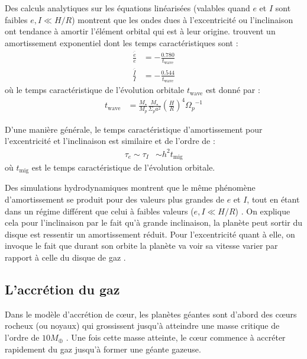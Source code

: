 Des calculs analytiques sur les équations linéarisées (valables quand $e$ et $I$ sont faibles $e,I \ll H/R$) montrent que les ondes dues à l'excentricité ou l'inclinaison ont tendance à amortir l'élément orbital qui est à leur origine. \cite[eqs. (45), (47)]{tanaka2004three} trouvent un amortissement exponentiel dont les temps caractéristiques sont : 
\begin{subequations}
\begin{align}
\frac{\overline{\dot{e}}}{e} &= -\frac{0.780}{t_\text{wave}}\\
\frac{\overline{\dot{I}}}{I} &= -\frac{0.544}{t_\text{wave}}
\end{align}
\end{subequations}
où le temps caractéristique de l'évolution orbitale $t_\text{wave}$ est donné par \cite[eq. (49)]{tanaka2004three} :
\begin{align}
t_\text{wave} &= \frac{M_\star}{M_p}\frac{M_\star}{\Sigma_p a^2} \left(\frac{H}{R}\right)^4 {\Omega_p}^{-1}
\end{align}

D'une manière générale, le temps caractéristique d'amortissement pour l'excentricité et l'inclinaison est similaire et de l'ordre de \citep{tanaka2004three} :
\begin{align}
\tau_e \sim \tau_I &\sim h^2 t_\text{mig}
\end{align}
où $t_\text{mig}$ est le temps caractéristique de l'évolution orbitale.

Des simulations hydrodynamiques montrent que le même phénomène d'amortissement se produit pour des valeurs plus grandes de $e$ et $I$, tout en étant dans un régime différent que celui à faibles valeurs ($e,I \ll H/R$) \citep{cresswell2007evolution}. On explique cela pour l'inclinaison par le fait qu'à grande inclinaison, la planète peut sortir du disque est ressentir un amortissement réduit. Pour l'excentricité quant à elle, on invoque le fait que durant son orbite la planète va voir sa vitesse varier par rapport à celle du disque de gaz \citep{papaloizou2000orbital}.

\subsection{L'accrétion du gaz}\label{sec:accretion_coeur}
Dans le modèle d'accrétion de cœur, les planètes géantes sont d'abord des cœurs rocheux (ou noyaux) qui grossissent jusqu'à 
atteindre une masse critique de l'ordre de $10 M_{\oplus}$ \citep{pollack1996formation}. Une fois cette masse atteinte, le cœur 
commence à accréter rapidement du gaz jusqu'à former une géante gazeuse.

